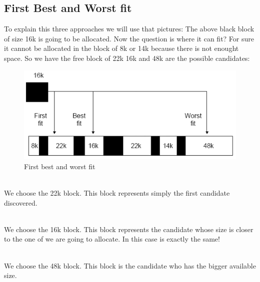 \documentclass[11pt]{article}
\begin{document}
\subsection{First Best and Worst fit}
To explain this three approaches we will use that pictures:
The above black block of size 16k is going to be allocated. Now the question is where it can fit? For sure it cannot be allocated in the block of 8k or 14k because there is not enought space. So we have the free block of 22k 16k and 48k are the possible candidates:
\begin{description}
\begin{figure}[H]
\centering
\includegraphics*{fbw}
\caption{First best and worst fit}
\end{figure}
  \item[First fit] \hfill \\
	We choose the 22k block. This block represents simply the first candidate discovered.
  \item[Best fit] \hfill \\
  	We choose the 16k block. This block represents the candidate whose size is closer to the one of we are going to allocate. In this case is exactly the same!
  \item[Worst fit] \hfill \\
	We choose the 48k block. This block is the candidate who has the bigger available size.
\end{description}
\end{document}
